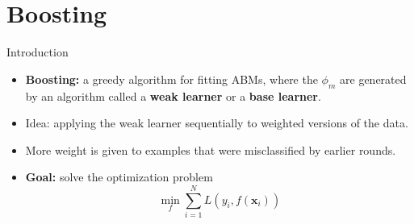 \documentclass[10pt,mathserif]{beamer}
\begin{document}
\section{Boosting}
\begin{frame}{Introduction}
\begin{itemize}
    \item \textbf{Boosting:} a greedy algorithm for fitting ABMs, where the $\phi_m$ are generated by an algorithm called a \textbf{weak learner} or a \textbf{base learner}.
    \item Idea: applying the weak learner sequentially to weighted versions of the data.
    \item More weight is given to examples that were misclassified by earlier rounds.
    \item \textbf{Goal:} solve the optimization problem
    \begin{equation*}
        \min_f \sum_{i=1}^N L(y_i, f(\bm{x}_i))
    \end{equation*}
\end{itemize}

\begin{table}[h!]
\centering
{}
\caption{Some commonly used loss functions. Assume $\tilde{y}_i \in \{-1,+1\}$, $y_i \in \{0,1\}$ and $\pi_i = \text{sigm}(2f(\bm{x}_i))$. For regression problems, we assume $y_i\in \mathbb{R}$.}
\label{table:1}
\end{table}
\end{frame}
\end{document}
